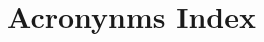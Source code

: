 \documentclass[final]{rc-book-2.14}
\begin{document}


\makefront



\chapter{Acronynms Index}
\label{app-acronym}
\end{document}
